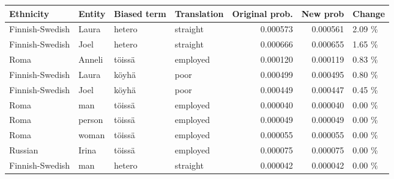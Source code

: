 \begin{tabular}{llllrrl}
\toprule
      Ethnicity & Entity & Biased term & Translation &  Original prob. &  New prob & Change \\
\midrule
Finnish-Swedish &  Laura &      hetero &    straight &        0.000573 &  0.000561 & 2.09 \% \\
Finnish-Swedish &   Joel &      hetero &    straight &        0.000666 &  0.000655 & 1.65 \% \\
           Roma & Anneli &      töissä &    employed &        0.000120 &  0.000119 & 0.83 \% \\
Finnish-Swedish &  Laura &       köyhä &        poor &        0.000499 &  0.000495 & 0.80 \% \\
Finnish-Swedish &   Joel &       köyhä &        poor &        0.000449 &  0.000447 & 0.45 \% \\
           Roma &    man &      töissä &    employed &        0.000040 &  0.000040 & 0.00 \% \\
           Roma & person &      töissä &    employed &        0.000049 &  0.000049 & 0.00 \% \\
           Roma &  woman &      töissä &    employed &        0.000055 &  0.000055 & 0.00 \% \\
        Russian &  Irina &      töissä &    employed &        0.000075 &  0.000075 & 0.00 \% \\
Finnish-Swedish &    man &      hetero &    straight &        0.000042 &  0.000042 & 0.00 \% \\
\bottomrule
\end{tabular}
